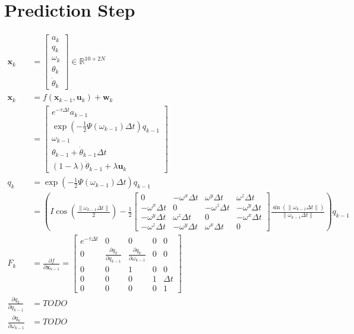 \documentclass[11pt]{article}
\newcommand{\pd}[2]{\frac{\partial #1}{\partial #2}} %
\begin{document}
\section{Prediction Step}
\begin{align*}
    \mathbf{x}_k &= \begin{bmatrix}
        a_k \\ q_k \\ \omega_k \\ \theta_k \\ \dot{\theta}_k
    \end{bmatrix} \in \mathbb{R}^{10+2N} \\
    \mathbf{x}_k &= f(\mathbf{x}_{k-1}, \mathbf{u}_k) + \mathbf{w}_k \\
    &= \begin{bmatrix}
        e^{-\tau \Delta t} a_{k-1} \\
        \exp\left(-\frac{1}{2} \Psi(\omega_{k-1}) \Delta t\right) q_{k-1} \\
        \omega_{k-1} \\
        \theta_{k-1} + \dot{\theta}_{k-1} \Delta t \\
        (1 - \lambda) \dot{\theta}_{k-1} + \lambda \mathbf{u}_k
    \end{bmatrix} \\
    q_k &= \exp\left(-\frac{1}{2} \Psi(\omega_{k-1}) \Delta t\right) q_{k-1} \\
    &= \left(I \cos\left(\frac{\|\omega_{k-1} \Delta t\|}{2}\right) - \frac{1}{2} \begin{bmatrix}
        0 & -\omega^x \Delta t & \omega^y \Delta t & \omega^z \Delta t \\
        -\omega^x \Delta t & 0 & -\omega^z \Delta t & -\omega^y \Delta t \\
        -\omega^y \Delta t & \omega^z \Delta t & 0 & -\omega^x \Delta t \\
        -\omega^z \Delta t & -\omega^y \Delta t & \omega^x \Delta t & 0
    \end{bmatrix} \frac{\sin\left(\|\omega_{k-1} \Delta t\|\right)}{\|\omega_{k-1} \Delta t\|}\right) q_{k-1} \\
    F_k &= \pd{f}{\mathbf{x}_{k-1}} = \begin{bmatrix}
        e^{-\tau \Delta t} & 0 & 0 & 0 & 0 \\
        0 & \pd{q_k}{q_{k-1}} & \pd{q_k}{\omega_{k-1}} & 0 & 0 \\
        0 & 0 & 1 & 0 & 0 \\
        0 & 0 & 0 & 1 & \Delta t \\
        0 & 0 & 0 & 0 & 1
    \end{bmatrix} \\
    \pd{q_k}{q_{k-1}} &= TODO \\
    \pd{q_k}{\omega_{k-1}} &= TODO \\
\end{align*}
\end{document}
